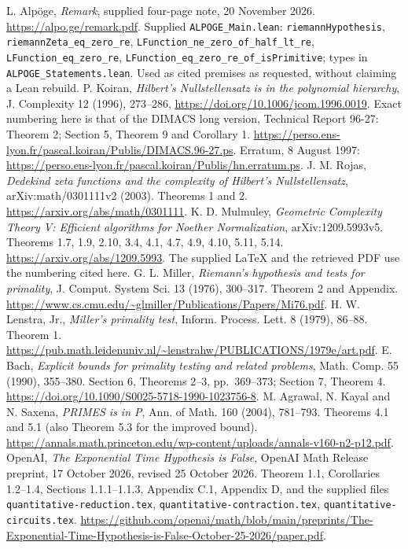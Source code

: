  L. Alp\"oge, \emph{Remark}, supplied four-page note, 20 November 2026. \url{https://alpo.ge/remark.pdf}. Supplied \texttt{ALPOGE\_Main.lean}: \texttt{riemannHypothesis}, \texttt{riemannZeta\_eq\_zero\_re}, \texttt{LFunction\_ne\_zero\_of\_half\_lt\_re}, \texttt{LFunction\_eq\_zero\_re}, \texttt{LFunction\_eq\_zero\_re\_of\_isPrimitive}; types in \texttt{ALPOGE\_Statements.lean}. Used as cited premises as requested, without claiming a Lean rebuild.
 P. Koiran, \emph{Hilbert's Nullstellensatz is in the polynomial hierarchy}, J. Complexity 12 (1996), 273--286, \url{https://doi.org/10.1006/jcom.1996.0019}. Exact numbering here is that of the DIMACS long version, Technical Report 96-27: Theorem 2; Section 5, Theorem 9 and Corollary 1. \url{https://perso.ens-lyon.fr/pascal.koiran/Publis/DIMACS.96-27.ps}. Erratum, 8 August 1997: \url{https://perso.ens-lyon.fr/pascal.koiran/Publis/hn.erratum.ps}.
 J. M. Rojas, \emph{Dedekind zeta functions and the complexity of Hilbert's Nullstellensatz}, arXiv:math/0301111v2 (2003). Theorems 1 and 2. \url{https://arxiv.org/abs/math/0301111}.
 K. D. Mulmuley, \emph{Geometric Complexity Theory V: Efficient algorithms for Noether Normalization}, arXiv:1209.5993v5. Theorems 1.7, 1.9, 2.10, 3.4, 4.1, 4.7, 4.9, 4.10, 5.11, 5.14. \url{https://arxiv.org/abs/1209.5993}. The supplied LaTeX and the retrieved PDF use the numbering cited here.
 G. L. Miller, \emph{Riemann's hypothesis and tests for primality}, J. Comput. System Sci. 13 (1976), 300--317. Theorem 2 and Appendix. \url{https://www.cs.cmu.edu/~glmiller/Publications/Papers/Mi76.pdf}.
 H. W. Lenstra, Jr., \emph{Miller's primality test}, Inform. Process. Lett. 8 (1979), 86--88. Theorem 1. \url{https://pub.math.leidenuniv.nl/~lenstrahw/PUBLICATIONS/1979e/art.pdf}.
 E. Bach, \emph{Explicit bounds for primality testing and related problems}, Math. Comp. 55 (1990), 355--380. Section 6, Theorems 2--3, pp.~369--373; Section 7, Theorem 4. \url{https://doi.org/10.1090/S0025-5718-1990-1023756-8}.
 M. Agrawal, N. Kayal and N. Saxena, \emph{PRIMES is in P}, Ann. of Math. 160 (2004), 781--793. Theorems 4.1 and 5.1 (also Theorem 5.3 for the improved bound). \url{https://annals.math.princeton.edu/wp-content/uploads/annals-v160-n2-p12.pdf}.
 OpenAI, \emph{The Exponential Time Hypothesis is False}, OpenAI Math Release preprint, 17 October 2026, revised 25 October 2026. Theorem 1.1, Corollaries 1.2--1.4, Sections 1.1.1--1.1.3, Appendix C.1, Appendix D, and the supplied files \texttt{quantitative-reduction.tex}, \texttt{quantitative-contraction.tex}, \texttt{quantitative-circuits.tex}. \url{https://github.com/openai/math/blob/main/preprints/The-Exponential-Time-Hypothesis-is-False-October-25-2026/paper.pdf}.
